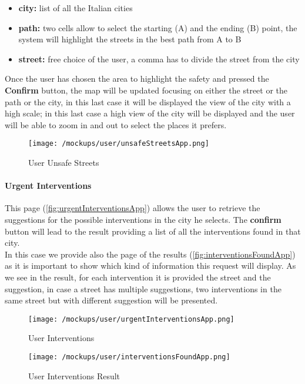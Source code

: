 			\begin{itemize}
				\item \textbf{city:} list of all the Italian cities
				\item \textbf{path:} two cells allow to select the starting (A) and the ending (B) point, the system will highlight the streets in the best path from A to B
				\item \textbf{street:} free choice of the user, a comma has to divide the street from the city
			\end{itemize}
		
			Once the user has chosen the area to highlight the safety and pressed the \textbf{Confirm} button, the map will be updated focusing on either the street or the path or the city, in this last case it will be displayed the view of the city with a high scale; in this last case a high view of the city will be displayed and the user will be able to zoom in and out to select the places it prefers.
			
			\vspace{0.6cm}
			
			\begin{figure}[ht!]
				\centering
				\texttt{[image: /mockups/user/unsafeStreetsApp.png]}
				\caption{\label{fig:unsafeStreetsApp} User Unsafe Streets}
			\end{figure}
		
			\paragraph{Urgent Interventions}
			This page (\autoref{fig:urgentInterventionsApp}) allows the user to retrieve the suggestions for the possible interventions in the city he selects. The \textbf{confirm} button will lead to the result providing a list of all the interventions found in that city.\\
			
			In this case we provide also the page of the results (\autoref{fig:interventionsFoundApp}) as it is important to show which kind of information this request will display. As we see in the result, for each intervention it is provided the street and the suggestion, in case a street has multiple suggestions, two interventions in the same street but with different suggestion will be presented.
			
			\vspace{0.6cm}
			
			\begin{figure}[ht!]
				\centering
				\begin{minipage}{0.5\textwidth}
					\centering
					\texttt{[image: /mockups/user/urgentInterventionsApp.png]}
					\caption{\label{fig:urgentInterventionsApp} User Interventions}
				\end{minipage}\hfill
				\begin{minipage}{0.5\textwidth}
					\centering
					\texttt{[image: /mockups/user/interventionsFoundApp.png]}
					\caption{\label{fig:interventionsFoundApp} User Interventions Result}
				\end{minipage}
			\end{figure}
		
